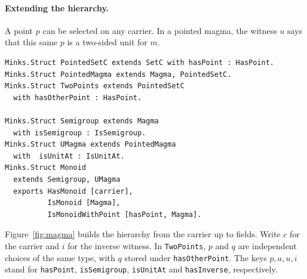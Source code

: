 \documentclass{article}
\newcommand{\ttt}[1]{\texttt{#1}}
\begin{document}
\paragraph{Extending the hierarchy.}
A point $p$ can be selected on any carrier. In a pointed magma, the
witness $u$ says that this same $p$ is a two-sided unit for $m$.
\begin{verbatim}
Minks.Struct PointedSetC extends SetC with hasPoint : HasPoint.
Minks.Struct PointedMagma extends Magma, PointedSetC.
Minks.Struct TwoPoints extends PointedSetC
  with hasOtherPoint : HasPoint.

Minks.Struct Semigroup extends Magma
  with isSemigroup : IsSemigroup.
Minks.Struct UMagma extends PointedMagma
  with  isUnitAt : IsUnitAt.
Minks.Struct Monoid
  extends Semigroup, UMagma
  exports HasMonoid [carrier],
          IsMonoid [Magma],
          IsMonoidWithPoint [hasPoint, Magma].
\end{verbatim}
Figure~\ref{fig:magma} builds the hierarchy from the carrier up to fields.
Write $c$ for the carrier and
$i$ for the inverse witness. In \ttt{TwoPoints}, $p$ and $q$ are independent
choices of the same type, with $q$ stored under \ttt{hasOtherPoint}.
The keys $p,a,u,i$ stand for \ttt{hasPoint}, \ttt{isSemigroup},
\ttt{isUnitAt} and \ttt{hasInverse}, respectively.
\end{document}
